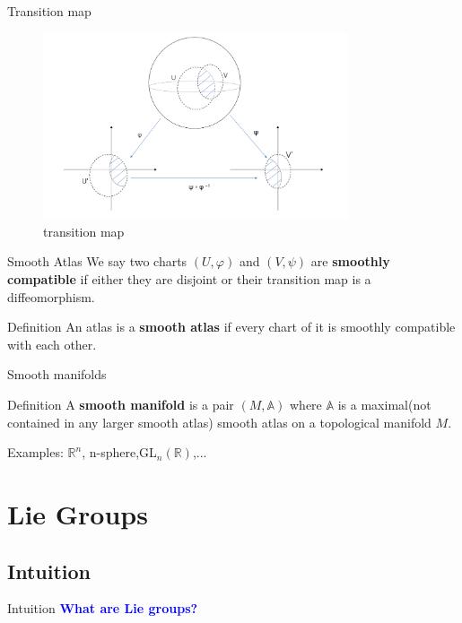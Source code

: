 \documentclass[smaller,xcolor=dvipsnames]{beamer}
\newcommand{\gln}{GL$_{n}(\mathbb{R})$}
\begin{document}
\begin{frame}{Transition map}
    \begin{figure}[tb]
\centering
\includegraphics[width=90mm]{transition map.png} 
\caption{transition map}
\end{figure}
\end{frame}

\begin{frame}{Smooth Atlas}
    We say two charts $(U,\varphi)$ and $(V,\psi)$ are {\bf smoothly compatible} if either they are disjoint or their transition map is a diffeomorphism.\\
    \pause
    \begin{block}{Definition}
    An atlas is a {\bf smooth atlas} if every chart of it is smoothly compatible with each other.
    \end{block}

\end{frame}

\begin{frame}{Smooth manifolds}
    \begin{block}{Definition}
A {\bf smooth manifold} is a pair $(M,\mathbb{A})$ where $\mathbb{A}$ is a maximal(not contained in any larger smooth atlas) smooth atlas on a topological manifold $M$.
    \end{block}
    \vspace{1cm}
    \pause
Examples: $\mathbb{R}^n$, n-sphere,\gln,...
\end{frame}

\section{Lie Groups}
\subsection{Intuition}
\begin{frame}{Intuition}
\textcolor{blue}{\textbf{What are Lie groups?}}
\end{frame}
\end{document}
